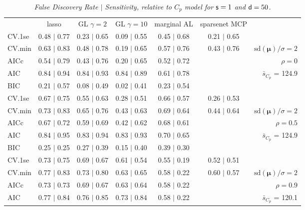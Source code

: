 \documentclass[12pt]{article}
\newcommand{\mr}[1]{\mathrm{#1}}
\newcommand{\bm}[1]{\mathbf{#1}}
\begin{document}
\begin{table}[p]\vspace{-.5cm}
\caption[l]{\label{sens}\it False Discovery Rate $\mid$ Sensitivity, relative to $C_p$ model  for ${\sf s}=1$ and ${\sf d}=50$.}
\vspace{-.5cm}
\small{}
\begin{center}
\begin{tabular}{l*{5}{c}|r}
 & lasso & GL $\gamma=2$ & GL $\gamma=10$ & marginal AL & sparsenet MCP  & \\
 \cline{1-7}
CV.1se & 0.48 $\mid$ 0.77 & 0.23 $\mid$ 0.65 & 0.09 $\mid$ 0.55 & 0.45 $\mid$ 0.68 & 0.21 $\mid$ 0.65 &\\
CV.min & 0.63 $\mid$ 0.83 & 0.48 $\mid$ 0.78 & 0.19 $\mid$ 0.65 & 0.57 $\mid$ 0.76 & 0.43 $\mid$ 0.76 &  $\mr{sd}(\bm{\mu})/\sigma=2$ \\
AICc & 0.54 $\mid$ 0.79 & 0.43 $\mid$ 0.76 & 0.20 $\mid$ 0.65 & 0.52 $\mid$ 0.72 & & $\rho=0$ \\
AIC & 0.84 $\mid$ 0.94 & 0.84 $\mid$ 0.93 & 0.84 $\mid$ 0.89 & 0.61 $\mid$ 0.78 & & \multirow{2}{*}{$\bar{s}_{C_p}$ = 124.9} \\
BIC & 0.21 $\mid$ 0.57 & 0.08 $\mid$ 0.49 & 0.02 $\mid$ 0.41 & 0.23 $\mid$ 0.54 & & \\
 \hline 
CV.1se & 0.67 $\mid$ 0.75 & 0.55 $\mid$ 0.63 & 0.28 $\mid$ 0.51 & 0.66 $\mid$ 0.57 & 0.26 $\mid$ 0.53 &\\
CV.min & 0.73 $\mid$ 0.83 & 0.65 $\mid$ 0.76 & 0.43 $\mid$ 0.63 & 0.69 $\mid$ 0.64 & 0.44 $\mid$ 0.64 &  $\mr{sd}(\bm{\mu})/\sigma=2$ \\
AICc & 0.67 $\mid$ 0.72 & 0.59 $\mid$ 0.69 & 0.42 $\mid$ 0.62 & 0.68 $\mid$ 0.61 & & $\rho=0.5$ \\
AIC & 0.84 $\mid$ 0.95 & 0.83 $\mid$ 0.94 & 0.83 $\mid$ 0.93 & 0.70 $\mid$ 0.65 & & \multirow{2}{*}{$\bar{s}_{C_p}$ = 124.9} \\
BIC & 0.25 $\mid$ 0.25 & 0.27 $\mid$ 0.39 & 0.15 $\mid$ 0.40 & 0.39 $\mid$ 0.30 & & \\
 \hline 
CV.1se & 0.73 $\mid$ 0.75 & 0.69 $\mid$ 0.67 & 0.61 $\mid$ 0.54 & 0.55 $\mid$ 0.19 & 0.52 $\mid$ 0.51 &\\
CV.min & 0.77 $\mid$ 0.83 & 0.73 $\mid$ 0.80 & 0.63 $\mid$ 0.65 & 0.58 $\mid$ 0.22 & 0.60 $\mid$ 0.57 &  $\mr{sd}(\bm{\mu})/\sigma=2$ \\
AICc & 0.73 $\mid$ 0.73 & 0.69 $\mid$ 0.67 & 0.63 $\mid$ 0.64 & 0.58 $\mid$ 0.22 & & $\rho=0.9$ \\
AIC & 0.77 $\mid$ 0.84 & 0.76 $\mid$ 0.85 & 0.73 $\mid$ 0.84 & 0.58 $\mid$ 0.22 & & \multirow{2}{*}{$\bar{s}_{C_p}$ = 120.1} \\

\end{tabular}
\end{center}
\end{table}
\end{document}
